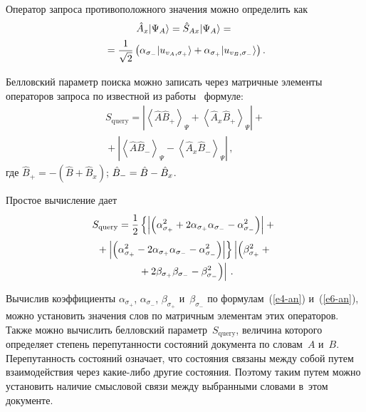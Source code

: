 \begin{multicols}{2}
    Оператор запроса противоположного значения можно определить как
    \begin{multline*}
    \hat{A}_x\vert \Psi_A\rangle = \hat{S}_{Ax} \vert \Psi_A\rangle 
={}\\
{}= \displaystyle\frac{\displaystyle 1\mathstrut}{\displaystyle \sqrt{2}\mathstrut}\left( \alpha_{\sigma_-}\vert u_{v_A,\sigma_+}\rangle 
+\alpha_{\sigma_+}\vert u_{v_B,\sigma_-}\rangle\right).
    \end{multline*}
    
    Белловский параметр поиска можно записать через матричные элементы 
операторов запроса по известной из работы~\cite{6-an} формуле:
    \begin{multline*}
    S_{\mathrm{query}}=\left\vert \left \langle \hat{A}\hat{B}_+\right\rangle_\Psi 
+\left\langle \hat{A}_x\hat{B}_+\right\rangle_\Psi\right\vert +{}\\
{}+
    \left\vert \left\langle \hat{A}\hat{B}_-\right\rangle_\Psi -\left\langle 
\hat{A}_x\hat{B}_-\right\rangle_\Psi\right\vert\,,
    \end{multline*}
где $\hat{B}_+= -(\hat{B}+\hat{B}_x)$; $\hat{B}_-\hm= \hat{B}\hm- \hat{B}_x$.
    
    Простое вычисление дает
    \begin{multline}
    S_{\mathrm{query}}= \displaystyle\frac{\displaystyle 1\mathstrut}{\displaystyle 2\mathstrut} \left\{ \left\vert \left( \alpha^2_{\sigma_+} 
+2\alpha_{\sigma_+} \alpha_{\sigma_-}-\alpha^2_{\sigma_-}\right)\right\vert 
+{}\right.\\
    \left.{}+
    \left\vert \left( \alpha^2_{\sigma_+} -2\alpha_{\sigma_+}\alpha_{\sigma_-} - 
\alpha^2_{\sigma_-}\right)\right\vert \right\} 
    \left\vert \left(\beta^2_{\sigma_+} +{}\right.\right.\\
   \left.\left. {}+ 2\beta_{\sigma_+} \beta_{\sigma_-} -
\beta^2_{\sigma_-}\right)\right\vert\,.
    \label{e11-an}
    \end{multline}
                
    
    Вычислив коэффициенты $\alpha_{\sigma_+}$, $\alpha_{\sigma_-}$, 
$\beta_{\sigma_+}$ и~$\beta_{\sigma_-}$ по  
формулам~(\ref{e4-an}) и~(\ref{e6-an}), можно установить значения слов по 
матричным элементам этих операторов. Также можно вычислить белловский 
параметр~$S_{\mathrm{query}}$, величина которого определяет степень пе\-ре\-пу\-тан\-ности 
состояний документа по словам~$A$ и~$B$. Перепутанность состояний 
означает, что со\-сто\-яния связаны между собой путем взаимодействия через 
ка\-кие-ли\-бо другие со\-сто\-яния. Поэтому таким путем мож\-но установить наличие 
смысловой связи между выбранными словами в~этом до\-ку\-менте. 
    

\end{multicols}
